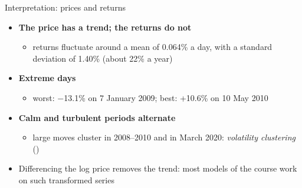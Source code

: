 \begin{frame}{Interpretation: prices and returns}
\itemsize{\small}
\begin{itemize}
    \item \textbf{The price has a trend; the returns do not}
    \begin{itemize}
        \item returns fluctuate around a mean of 0.064\% a day, with a standard deviation of 1.40\% (about 22\% a year)
    \end{itemize}
    \item \textbf{Extreme days}
    \begin{itemize}
        \item worst: \ensuremath{-}13.1\% on 7 January 2009; best: +10.6\% on 10 May 2010
    \end{itemize}
    \item \textbf{Calm and turbulent periods alternate}
    \begin{itemize}
        \item large moves cluster in 2008--2010 and in March 2020: \emph{volatility clustering} ()
    \end{itemize}
    \item Differencing the log price removes the trend: most models of the course work on such transformed series
\end{itemize}
\end{frame}

